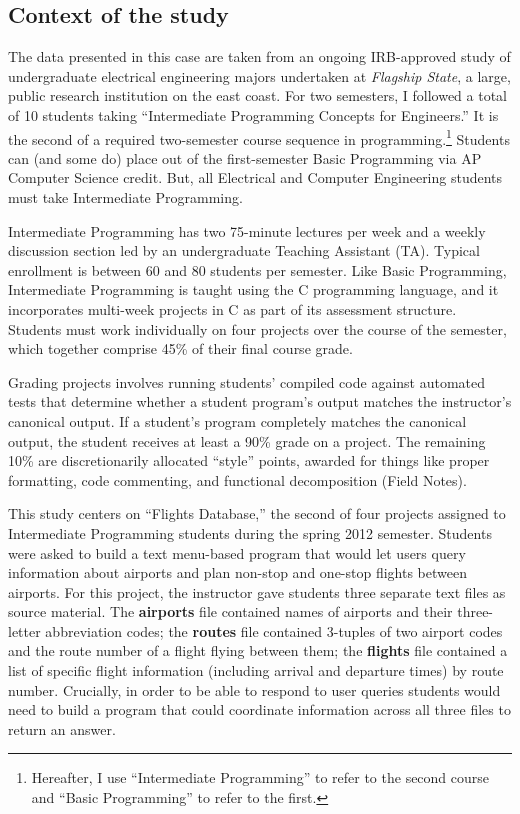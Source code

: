 \subsection{Context of the study}\label{context-of-the-study}

The data presented in this case are taken from an ongoing IRB-approved study of undergraduate electrical engineering majors undertaken at \emph{Flagship State}, a large, public research institution on the east coast. For two semesters, I followed a total of 10 students taking ``Intermediate Programming Concepts for Engineers.'' It is the second of a required two-semester course sequence in programming.\footnote{Hereafter, I use ``Intermediate Programming'' to refer to the second course and ``Basic Programming'' to refer to the first.} Students can (and some do) place out of the first-semester Basic Programming via AP Computer Science credit. But, all Electrical and Computer Engineering students must take Intermediate Programming.

Intermediate Programming has two 75-minute lectures per week and a weekly discussion section led by an undergraduate Teaching Assistant (TA). Typical enrollment is between 60 and 80 students per semester. Like Basic Programming, Intermediate Programming is taught using the C programming language, and it incorporates multi-week projects in C as part of its assessment structure. Students must work individually on four projects over the course of the semester, which together comprise 45\% of their final course grade.

Grading projects involves running students' compiled code against automated tests that determine whether a student program's output matches the instructor's canonical output. If a student's program completely matches the canonical output, the student receives at least a 90\% grade on a project. The remaining 10\% are discretionarily allocated ``style'' points, awarded for things like proper formatting, code commenting, and functional decomposition (Field Notes).

This study centers on ``Flights Database,'' the second of four projects assigned to Intermediate Programming students during the spring 2012 semester. Students were asked to build a text menu-based program that would let users query information about airports and plan non-stop and one-stop flights between airports. For this project, the instructor gave students three separate text files as source material. The \textbf{airports} file contained names of airports and their three-letter abbreviation codes; the \textbf{routes} file contained 3-tuples of two airport codes and the route number of a flight flying between them; the \textbf{flights} file contained a list of specific flight information (including arrival and departure times) by route number. Crucially, in order to be able to respond to user queries students would need to build a program that could coordinate information across all three files to return an answer.

